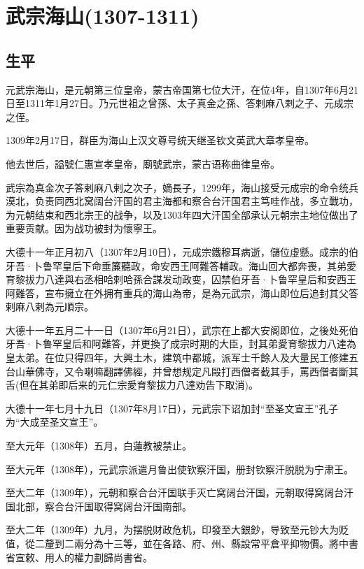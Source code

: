 
\section{武宗海山\tiny(1307-1311)}

\subsection{生平}

元武宗海山，是元朝第三位皇帝，蒙古帝国第七位大汗，在位4年，自1307年6月21日至1311年1月27日。乃元世祖之曾孫、太子真金之孫、答剌麻八剌之子、元成宗之侄。

1309年2月17日，群臣为海山上汉文尊号统天继圣钦文英武大章孝皇帝。

他去世后，謚號仁惠宣孝皇帝，廟號武宗，蒙古语称曲律皇帝。

武宗為真金次子答剌麻八剌之次子，嫡長子，1299年，海山接受元成宗的命令统兵漠北，负责同西北窝阔台汗国的君主海都和察合台汗国君主笃哇作战，多立戰功，为元朝结束和西北宗王的战争，以及1303年四大汗国全部承认元朝宗主地位做出了重要贡献。因为战功被封为懷寧王。

大德十一年正月初八（1307年2月10日），元成宗鐵穆耳病逝，儲位虛懸。成宗的伯牙吾·卜鲁罕皇后下命垂簾聽政，命安西王阿難答輔政。海山回大都奔喪，其弟愛育黎拔力八達與右丞相哈剌哈孫合謀发动政变，囚禁伯牙吾·卜鲁罕皇后和安西王阿難答，宣布擁立在外拥有重兵的海山為帝，是為元武宗，海山即位后追封其父答剌麻八剌為元順宗。

大德十一年五月二十一日（1307年6月21日），武宗在上都大安阁即位，之後处死伯牙吾·卜鲁罕皇后和阿難答，并更換了成宗时期的大臣，封其弟愛育黎拔力八達為皇太弟。在位只得四年，大興土木，建筑中都城，派军士千餘人及大量民工修建五台山華佛寺，又令喇嘛翻譯佛經，并曾想规定凡毆打西僧者截其手，罵西僧者斷其舌(但在其弟即后来的元仁宗愛育黎拔力八達劝告下取消)。

大德十一年七月十九日（1307年8月17日），元武宗下诏加封“至圣文宣王”孔子为“大成至圣文宣王”。

至大元年（1308年）五月，白蓮教被禁止。

至大元年（1308年），元武宗派遣月鲁出使钦察汗国，册封钦察汗脱脱为宁肃王。

至大二年（1309年），元朝和察合台汗国联手灭亡窝阔台汗国，元朝取得窝阔台汗国北部，察合台汗国取得窝阔台汗国南部。

至大二年（1309年）九月，为摆脱财政危机，印發至大銀鈔，导致至元钞大为贬值，從二釐到二兩分為十三等，並在各路、府、州、縣設常平倉平抑物價。將中書省宣敕、用人的權力劃歸尚書省。

